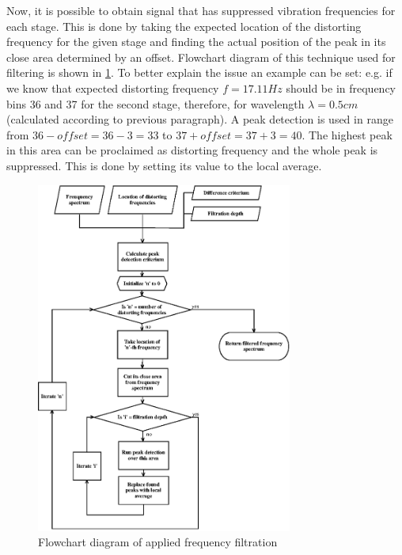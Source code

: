 \documentclass[twoside]{ctuthesis}
\theoremstyle{plain}
\theoremstyle{definition}
\theoremstyle{note}
\begin{document}
Now, it is possible to obtain signal that has suppressed vibration frequencies for each stage. This is done by taking the expected location of the distorting frequency for the given stage and finding the actual position of the peak in its close area determined by an offset. Flowchart diagram of this technique used for filtering is shown in \ref{fig:frequencyFiltration}. To better explain the issue an example can be set: e.g. if we know that expected distorting frequency $f=17.11Hz$ should be in frequency bins 36 and 37 for the second stage, therefore, for wavelength $\lambda=0.5cm$ (calculated according to previous paragraph). A peak detection is used in range from $36-offset=36-3=33$ to $37+offset=37+3=40$. The highest peak in this area can be proclaimed as distorting frequency and the whole peak is suppressed. This is done by setting its value to the local average.

\begin{figure}[h]
	\centering
	\includegraphics[width=0.75\textwidth]{frequencyFiltration.eps}
	\caption{Flowchart diagram of applied frequency filtration}
	\label{fig:frequencyFiltration}
\end{figure}
\end{document}
